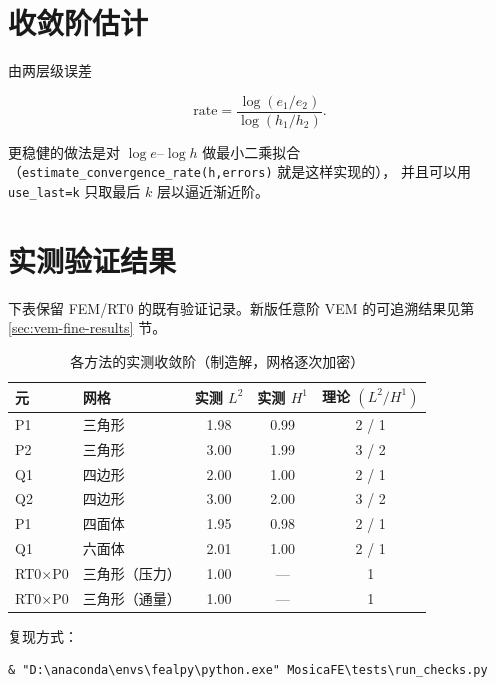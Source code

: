 \documentclass[UTF8,11pt,oneside]{ctexbook}
\theoremstyle{definition}
\theoremstyle{plain}
\newcommand{\code}[1]{\texttt{#1}}
\begin{document}
\section{收敛阶估计}

由两层级误差

\begin{equation}
\text{rate}=\frac{\log(e_1/e_2)}{\log(h_1/h_2)} .
\label{eq:rate}
\end{equation}

更稳健的做法是对 $\log e$--$\log h$ 做最小二乘拟合
（\code{estimate\_\allowbreak convergence\_\allowbreak rate(h,\allowbreak  errors)} 就是这样实现的），
并且可以用 \code{use\_\allowbreak last=k} 只取最后 $k$ 层以逼近渐近阶。

\section{实测验证结果}
\label{sec:verify}

下表保留 FEM/RT0 的既有验证记录。新版任意阶 VEM 的可追溯结果见第 \ref{sec:vem-fine-results} 节。


\begin{table}[htbp]
\centering
\caption{各方法的实测收敛阶（制造解，网格逐次加密）}
\label{tab:verify}
\begin{lrbox}{\guideTableBox}
\begin{tabular}{@{}llccc@{}}
\toprule
元 & 网格 & 实测 $L^2$ & 实测 $H^1$ & 理论 $(L^2/H^1)$ \\
\midrule
P1 & 三角形 & 1.98 & 0.99 & 2 / 1 \\
P2 & 三角形 & 3.00 & 1.99 & 3 / 2 \\
Q1 & 四边形 & 2.00 & 1.00 & 2 / 1 \\
Q2 & 四边形 & 3.00 & 2.00 & 3 / 2 \\
P1 & 四面体 & 1.95 & 0.98 & 2 / 1 \\
Q1 & 六面体 & 2.01 & 1.00 & 2 / 1 \\
RT0$\times$P0 & 三角形（压力） & 1.00 & --- & 1 \\
RT0$\times$P0 & 三角形（通量） & 1.00 & --- & 1 \\
\bottomrule
\end{tabular}
\end{lrbox}%
\ifdim\wd\guideTableBox>\linewidth
  \resizebox{\linewidth}{!}{\usebox{\guideTableBox}}%
\else\usebox{\guideTableBox}\fi
\end{table}

复现方式：

\begin{lstlisting}[style=shell]
& "D:\anaconda\envs\fealpy\python.exe" MosicaFE\tests\run_checks.py
\end{lstlisting}
\end{document}
